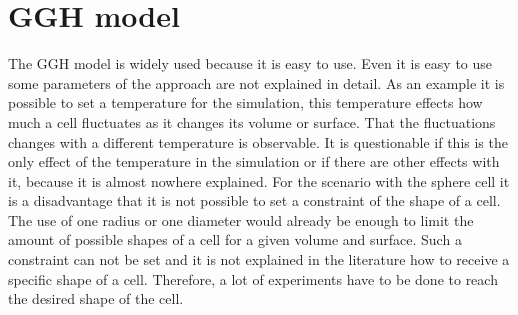 \section{GGH model}
The \ac{GGH} model is widely used because it is easy to use. Even it is easy to use some parameters of the approach are not explained in detail. As an example it is possible to set a temperature for the simulation, this temperature effects how much a cell fluctuates as it changes its volume or surface. That the fluctuations changes with a different temperature is observable. It is questionable if this is the only effect of the temperature in the simulation or if there are other effects with it, because it is almost nowhere explained.  \newline
For the scenario with the sphere cell it is a disadvantage that it is not possible to set a constraint of the shape of a cell. The use of one radius or one diameter would already be enough to limit the amount of possible shapes of a cell for a given volume and surface. Such a constraint can not be set and it is not explained in the literature how to receive a specific shape of a cell. Therefore, a lot of experiments have to be done to reach the desired shape of the cell.